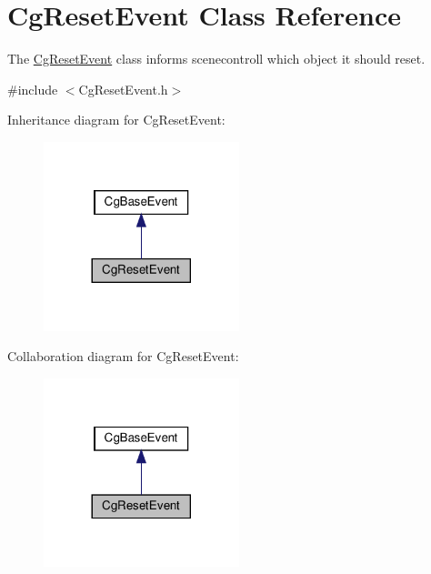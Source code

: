 \hypertarget{class_cg_reset_event}{}\section{Cg\+Reset\+Event Class Reference}
\label{class_cg_reset_event}


The \hyperlink{class_cg_reset_event}{Cg\+Reset\+Event} class informs scenecontroll which object it should reset.  




{\ttfamily \#include $<$Cg\+Reset\+Event.\+h$>$}



Inheritance diagram for Cg\+Reset\+Event\+:
\nopagebreak
\begin{figure}[H]
\begin{center}
\leavevmode
\includegraphics[width=161pt]{class_cg_reset_event__inherit__graph}
\end{center}
\end{figure}


Collaboration diagram for Cg\+Reset\+Event\+:
\nopagebreak
\begin{figure}[H]
\begin{center}
\leavevmode
\includegraphics[width=161pt]{class_cg_reset_event__coll__graph}
\end{center}
\end{figure}
